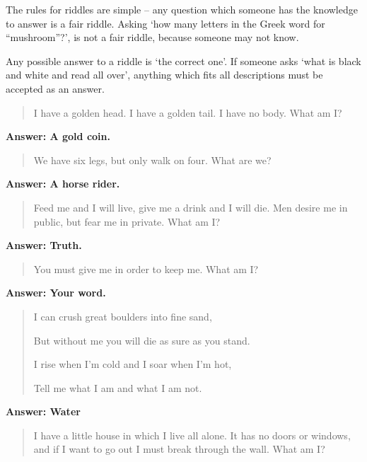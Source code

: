 \begin{multicols}{2}

The rules for riddles are simple -- any question which someone has the knowledge to answer is a fair riddle.
Asking `how many letters in the Greek word for ``mushroom''?', is not a fair riddle, because someone may not know.

Any possible answer to a riddle is `the correct one'.
If someone asks `what is black and white and read all over', anything which fits all descriptions must be accepted as an answer.

\begin{quotation}
I have a golden head. I have a golden tail. I have no body.
What am I?
\end{quotation}

\textbf{Answer: A gold coin.}

\begin{quotation}
We have six legs, but only walk on four.
What are we?
\end{quotation}

\textbf{Answer: A horse rider.}

\begin{quotation}
Feed me and I will live, give me a drink and I will die.
Men desire me in public, but fear me in private.
What am I?
\end{quotation}

\textbf{Answer: Truth.}

\begin{quotation}
You must give me in order to keep me.
What am I? 
\end{quotation}

\textbf{Answer: Your word.}

\begin{quotation}

I can crush great boulders into fine sand,

But without me you will die as sure as you stand.

I rise when I'm cold and I soar when I'm hot,

Tell me what I am and what I am not.

\end{quotation}

\textbf{Answer: Water}

\begin{quotation}

I have a little house in which I live all alone.
It has no doors or windows, and if I want to go out I must break through the wall.
What am I?
\end{quotation}


\end{multicols}
